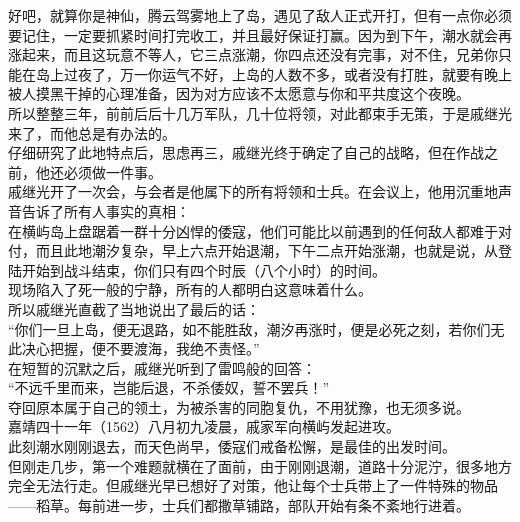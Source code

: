 \begin{multicols}{\theparacolNo}
好吧，就算你是神仙，腾云驾雾地上了岛，遇见了敌人正式开打，但有一点你必须要记住，一定要抓紧时间打完收工，并且最好保证打赢。因为到下午，潮水就会再涨起来，而且这玩意不等人，它三点涨潮，你四点还没有完事，对不住，兄弟你只能在岛上过夜了，万一你运气不好，上岛的人数不多，或者没有打胜，就要有晚上被人摸黑干掉的心理准备，因为对方应该不太愿意与你和平共度这个夜晚。\\

所以整整三年，前前后后十几万军队，几十位将领，对此都束手无策，于是戚继光来了，而他总是有办法的。\\

仔细研究了此地特点后，思虑再三，戚继光终于确定了自己的战略，但在作战之前，他还必须做一件事。\\

戚继光开了一次会，与会者是他属下的所有将领和士兵。在会议上，他用沉重地声音告诉了所有人事实的真相：\\

在横屿岛上盘踞着一群十分凶悍的倭寇，他们可能比以前遇到的任何敌人都难于对付，而且此地潮汐复杂，早上六点开始退潮，下午二点开始涨潮，也就是说，从登陆开始到战斗结束，你们只有四个时辰（八个小时）的时间。\\

现场陷入了死一般的宁静，所有的人都明白这意味着什么。\\

所以戚继光直截了当地说出了最后的话：\\

“你们一旦上岛，便无退路，如不能胜敌，潮汐再涨时，便是必死之刻，若你们无此决心把握，便不要渡海，我绝不责怪。”\\

在短暂的沉默之后，戚继光听到了雷鸣般的回答：\\

“不远千里而来，岂能后退，不杀倭奴，誓不罢兵！”\\

夺回原本属于自己的领土，为被杀害的同胞复仇，不用犹豫，也无须多说。\\

嘉靖四十一年（1562）八月初九凌晨，戚家军向横屿发起进攻。\\

此刻潮水刚刚退去，而天色尚早，倭寇们戒备松懈，是最佳的出发时间。\\

但刚走几步，第一个难题就横在了面前，由于刚刚退潮，道路十分泥泞，很多地方完全无法行走。但戚继光早已想好了对策，他让每个士兵带上了一件特殊的物品——稻草。每前进一步，士兵们都撒草铺路，部队开始有条不紊地行进着。\\


\end{multicols}
